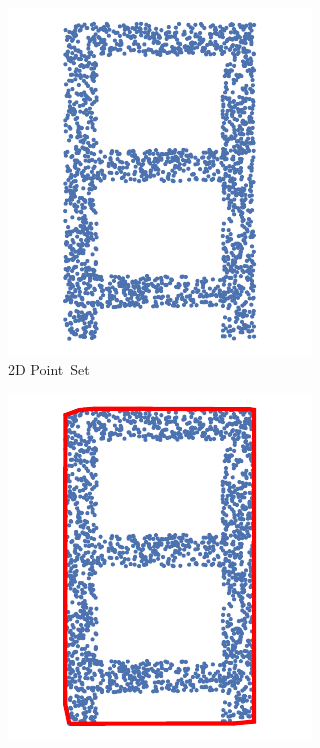 \begin{figure}[H]
\centering
\setcounter{subfigure}{1} 
  \begin{subfigure}{.24\linewidth}
    \centering\includegraphics[width=.8\linewidth]{chapter_3_polylidar3d/imgs/concave_vs_convex_lettera_0.pdf}
    \caption{\label{fig:ch3_convex_concave_1}2D Point~Set}\vspace{6pt}
  \end{subfigure}
  \begin{subfigure}{.24\linewidth}
    \centering\includegraphics[width=.8\linewidth]{chapter_3_polylidar3d/imgs/concave_vs_convex_lettera_1.pdf}

\end{subfigure}
\end{figure}

